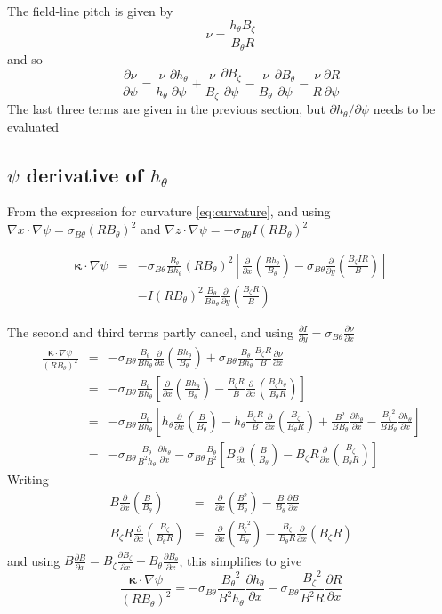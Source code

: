 \documentclass[12pt]{article}
\newcommand{\sbt}{\ensuremath{\sigma_{B\theta}}}
\newcommand{\deriv}[2]{\ensuremath{\frac{\partial #1}{\partial #2}}}
\newcommand{\hthe}{\ensuremath{h_\theta}}
\newcommand{\Bp}{\ensuremath{B_\theta}}
\newcommand{\Bt}{\ensuremath{B_\zeta}}
\newcommand{\Vec}[1]{\ensuremath{\mathbf{#1}}}
\newcommand{\kvec}{\Vec{\kappa}}
\newcommand{\rbp}{\ensuremath{R\Bp}}
\newcommand{\rbpsq}{\ensuremath{\left(\rbp\right)^2}}
\begin{document}
The field-line pitch is given by
\[
\nu = \frac{\hthe\Bt}{\Bp R}
\]
and so
\[
\deriv{\nu}{\psi} = \frac{\nu}{\hthe}\deriv{\hthe}{\psi} + \frac{\nu}{\Bt}\deriv{\Bt}{\psi} - \frac{\nu}{\Bp}\deriv{\Bp}{\psi} - \frac{\nu}{R}\deriv{R}{\psi}
\]
The last three terms are given in the previous section, but $\partial\hthe/\partial\psi$ needs to be evaluated

\subsection{$\psi$ derivative of $\hthe$}

From the expression for curvature \ref{eq:curvature}, and using $\nabla x \cdot \nabla \psi = \sbt \left(R\Bp\right)^2$ and $\nabla z\cdot\nabla \psi = -\sbt I \left(R\Bp\right)^2$

\begin{eqnarray*}
\kvec\cdot\nabla\psi &=& -\sbt \frac{\Bp}{B\hthe}\rbpsq\left[\deriv{}{x}\left(\frac{B\hthe}{\Bp}\right) - \sbt\deriv{}{y}\left(\frac{\Bt IR}{B}\right)\right] \\
&&- I\rbpsq \frac{\Bp}{B\hthe}\deriv{}{y}\left(\frac{\Bt R}{B}\right)
\end{eqnarray*}

The second and third terms partly cancel, and using $\deriv{I}{y} = \sbt \deriv{\nu}{x}$
\begin{eqnarray*}
  \frac{\kvec\cdot\nabla\psi}{\rbpsq} &=& -\sbt\frac{\Bp}{B\hthe}\deriv{}{x}\left(\frac{B\hthe}{\Bp}\right) + \sbt\frac{\Bp}{B\hthe}\frac{\Bt R}{B}\deriv{\nu}{x} \\
  &=& -\sbt\frac{\Bp}{B\hthe}\left[\deriv{}{x}\left(\frac{B\hthe}{\Bp}\right) - \frac{\Bt R}{B}\deriv{}{x}\left(\frac{\Bt\hthe}{\Bp R}\right)\right] \\
  &=& -\sbt\frac{\Bp}{B\hthe}\left[\hthe\deriv{}{x}\left(\frac{B}{\Bp}\right) - \hthe\frac{\Bt R}{B}\deriv{}{x}\left(\frac{\Bt}{\Bp R}\right) + \frac{B^2}{B\Bp}\deriv{\hthe}{x} - \frac{\Bt^2}{B\Bp}\deriv{\hthe}{x}\right] \\
  &=& -\sbt \frac{\Bp}{B^2\hthe}\deriv{\hthe}{x} - \sbt\frac{\Bp}{B^2}\left[B\deriv{}{x}\left(\frac{B}{\Bp}\right) - \Bt R\deriv{}{x}\left(\frac{\Bt}{\Bp R}\right)\right]
\end{eqnarray*}
Writing
\begin{eqnarray*}
B\deriv{}{x}\left(\frac{B}{\Bp}\right) &=& \deriv{}{x}\left(\frac{B^2}{\Bp}\right) - \frac{B}{\Bp}\deriv{B}{x} \\
\Bt R\deriv{}{x}\left(\frac{\Bt}{\Bp R}\right) &=& \deriv{}{x}\left(\frac{\Bt^2}{\Bp}\right) - \frac{\Bt}{\Bp R}\deriv{}{x}\left(\Bt R\right)
\end{eqnarray*}
and using $B\deriv{B}{x} = \Bt\deriv{\Bt}{x} + \Bp\deriv{\Bp}{x}$, this simplifies to give
\begin{equation}
\frac{\kvec\cdot\nabla\psi}{\rbpsq} = -\sbt\frac{\Bp^2}{B^2\hthe}\deriv{\hthe}{x} - \sbt\frac{\Bt^2}{B^2 R}\deriv{R}{x}
\label{eq:dhdpsi}
\end{equation}
\end{document}
